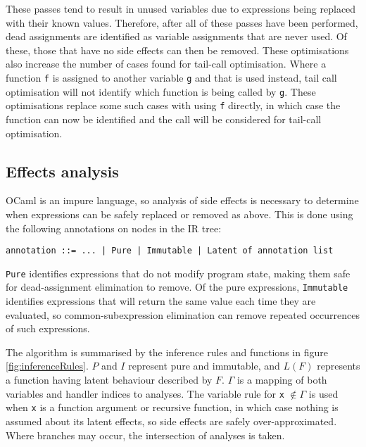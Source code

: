 These passes tend to result in unused variables due to expressions being replaced with their known values. Therefore, after all of these passes have been performed,  dead assignments are identified as variable assignments that are never used. Of these, those that have no side effects can then be removed. 
These optimisations also increase the number of cases found for tail-call optimisation. Where a function \verb|f| is assigned to another variable \verb|g| and that is used instead, tail call optimisation will not identify which function is being called by \verb|g|. These optimisations replace some such cases with using \verb|f| directly, in which case the function can now be identified and the call will be considered for tail-call optimisation.


\subsection{Effects analysis}
OCaml is an impure language, so analysis of side effects is necessary to determine when expressions can be safely replaced or removed as above. This is done using the following annotations on nodes in the IR tree:

\verb"annotation ::= ... | Pure | Immutable | Latent of annotation list"

\verb|Pure| identifies expressions that do not modify program state, making them safe for dead-assignment elimination to remove. Of the pure expressions, \verb|Immutable| identifies expressions that will return the same value each time they are evaluated, so common-subexpression elimination can remove repeated occurrences of such expressions.






The algorithm is summarised by the inference rules and functions in figure \ref{fig:inferenceRules}. $P$ and $I$ represent pure and immutable, and $L(F)$ represents a function having latent behaviour described by $F$. $\Gamma$ is a mapping of both variables and handler indices to analyses. The variable rule for \verb|x| $\not \in \Gamma$ is used when \verb|x| is a function argument or recursive function, in which case nothing is assumed about its latent effects, so side effects are safely over-approximated. Where branches may occur, the intersection of analyses is taken.

